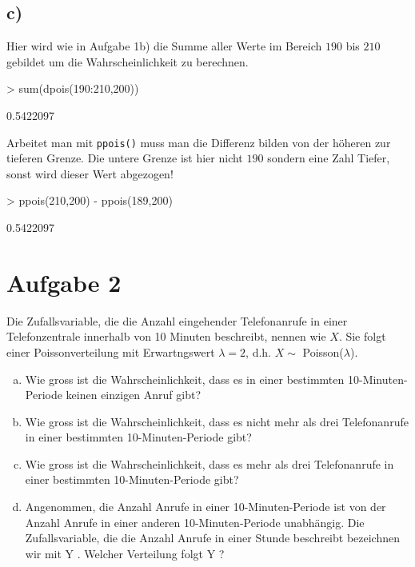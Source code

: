 \subsection*{c)}
Hier wird wie in Aufgabe 1b) die Summe aller Werte im Bereich $190$ bis $210$
gebildet um die Wahrscheinlichkeit zu berechnen.
\begin{Schunk}
\begin{Sinput}
> sum(dpois(190:210,200))
\end{Sinput}
\begin{Soutput}
[1] 0.5422097
\end{Soutput}
\end{Schunk}
Arbeitet man mit \verb!ppois()! muss man die Differenz bilden von der 
höheren zur tieferen Grenze. Die untere Grenze ist hier nicht $190$ sondern
eine Zahl Tiefer, sonst wird dieser Wert abgezogen!
\begin{Schunk}
\begin{Sinput}
> ppois(210,200) - ppois(189,200)
\end{Sinput}
\begin{Soutput}
[1] 0.5422097
\end{Soutput}
\end{Schunk}

\section{Aufgabe 2}
Die Zufallsvariable, die die Anzahl eingehender Telefonanrufe in einer 
Telefonzentrale innerhalb von 10 Minuten beschreibt, nennen wie $X$.
Sie folgt einer Poissonverteilung mit Erwartngswert $\lambda = 2$, d.h.
$X \sim$ Poisson($\lambda$).

\begin{enumerate}[(a)]
	\item Wie gross ist die Wahrscheinlichkeit, dass es in einer 
          bestimmten 10-Minuten-Periode keinen einzigen Anruf gibt?
    \item Wie gross ist die Wahrscheinlichkeit, dass es nicht mehr als drei 
          Telefonanrufe in einer bestimmten 10-Minuten-Periode gibt?
    \item Wie gross ist die Wahrscheinlichkeit, dass es mehr als drei 
          Telefonanrufe in einer bestimmten 10-Minuten-Periode gibt?
    \item Angenommen, die Anzahl Anrufe in einer 10-Minuten-Periode ist von 
          der Anzahl Anrufe in einer anderen 10-Minuten-Periode unabhängig. 
          Die Zufallsvariable, die die Anzahl Anrufe in einer Stunde 
          beschreibt bezeichnen wir mit Y . Welcher Verteilung folgt Y ?
\end{enumerate}

